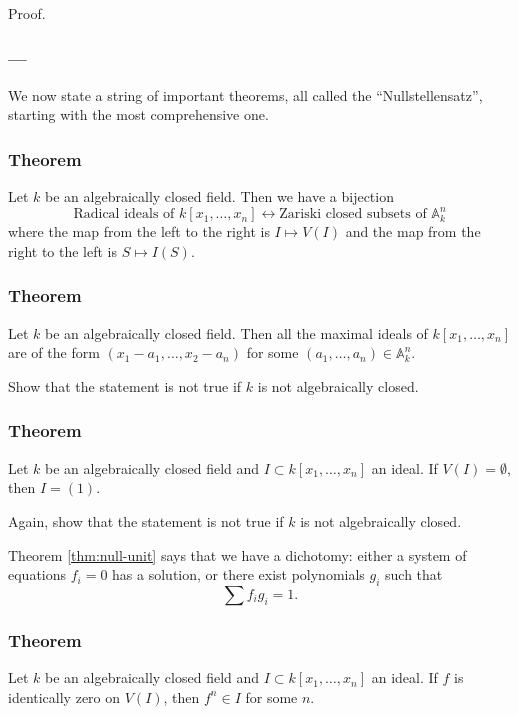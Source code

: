 \documentclass[11pt]{article}
\begin{document}
\begin{skipped}
Proof.
\end{skipped}

\subsubsection{---}
\label{sec:org542f245}
We now state a string of important theorems, all called the ``Nullstellensatz'', starting with the most comprehensive one.
\subsubsection{Theorem}
\label{sec:org6a4f744}
\label{thm:null}
Let \(k\) be an algebraically closed field. Then we have a bijection
\[ \text{Radical ideals of \(k[x_1, \dots, x_n]\)} \leftrightarrow \text{Zariski closed subsets of \(\mathbb A^n_k\)}\]
where the map from the left to the right is \(I \mapsto V(I)\) and the map from the right to the left is \(S \mapsto I(S)\).

\subsubsection{Theorem}
\label{sec:orgaab3681}
\label{thm:null-max}
Let \(k\) be an algebraically closed field. Then all the maximal ideals of \(k[x_1,\dots,x_n]\) are of the form \((x_1-a_1, \dots, x_2-a_n)\) for some \((a_1, \dots, a_n) \in \mathbb A^n_k\).

\begin{skipped}
Show that the statement is not true if \(k\) is not algebraically closed.
\end{skipped}

\subsubsection{Theorem}
\label{sec:org0f4b415}
\label{thm:null-unit}
 Let \(k\) be an algebraically closed field and \(I \subset k[x_1,\dots,x_n]\) an ideal. If \(V(I) = \emptyset\), then \(I = (1)\).

\begin{skipped}
Again, show that the statement is not true if \(k\) is not algebraically closed.
\end{skipped}
Theorem \ref{thm:null-unit} says that we have a dichotomy: either a system of equations \(f_i = 0\) has a solution, or there exist polynomials \(g_i\) such that
 \[ \sum f_i g_i = 1.\]

\subsubsection{Theorem}
\label{sec:orge3d8ee9}
\label{thm:null-power}
Let \(k\) be an algebraically closed field and \(I \subset k[x_1,\dots,x_n]\) an ideal. If \(f\) is identically zero on \(V(I)\), then \(f^n \in I\) for some \(n\).
\end{document}
